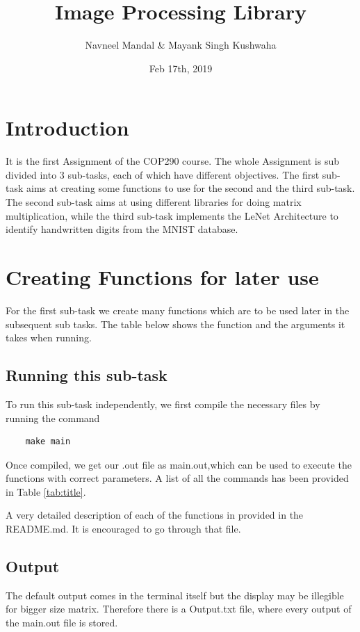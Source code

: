 \documentclass[a4paper]{article}
\title{Image Processing Library}
\author{Navneel Mandal \& Mayank Singh Kushwaha}
\date{Feb 17th, 2019}
\begin{document}
\maketitle

\section{Introduction}

It is the first Assignment of the COP290 course. The whole Assignment is sub divided into 3 sub-tasks, each of which have different objectives. The first sub-task aims at creating some functions to use for the second and the third sub-task. The second sub-task aims at using different libraries for doing matrix multiplication, while the third sub-task implements the LeNet Architecture to identify handwritten digits from the MNIST database.

\section{Creating Functions for later use}

For the first sub-task we create many functions which are to be used later in the subsequent sub tasks. The table below shows the function and the arguments it takes when running.

\subsection{Running this sub-task}
To run this sub-task independently, we first compile the necessary files by running the command
\begin{verbatim}
    make main
\end{verbatim}
Once compiled, we get our .out file as main.out,which can be used to execute the functions with correct parameters. A list of all the commands has been provided in Table \ref{tab:title}. 

A very detailed description of each of the functions in provided in the README.md. It is encouraged to go through that file.

\subsection{Output}
The default output comes in the terminal itself but the display may be illegible for bigger size matrix. Therefore there is a Output.txt file, where every output of the main.out file is stored.
\end{document}
